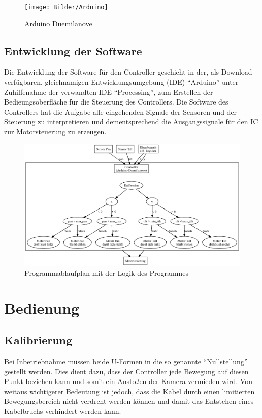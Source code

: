 \documentclass[a4paper, 12pt, bibtotocnumbered, liststotocnumbered]{scrartcl}
\begin{document}
	\begin{figure}[htb]
		\centering
		\texttt{[image: Bilder/Arduino]}
		\caption{Arduino Duemilanove}
	\end{figure}

	\subsection{Entwicklung der Software}
	Die Entwicklung der Software für den Controller geschieht in der, als Download verfügbaren, gleichnamigen Entwicklungsumgebung (IDE) “Arduino” unter Zuhilfenahme der verwandten IDE “Processing”, zum Erstellen der Bedieungsoberfläche für die Steuerung des Controllers.
	Die Software des Controllers hat die Aufgabe alle eingehenden Signale der Sensoren und der Steuerung zu interpretieren und dementsprechend die Ausgangssignale für den IC zur Motorsteuerung zu erzeugen.

	\begin{figure}[htb]
		\centering
		\includegraphics[scale=0.7,angle=90]{Bilder/Programmablaufplan}
		\caption{Programmablaufplan mit der Logik des Programmes}
	\end{figure}

	\section{Bedienung}
	\subsection{Kalibrierung}
	Bei Inbetriebnahme müssen beide U-Formen in die so genannte “Nullstellung” gestellt werden. Dies dient dazu, dass der Controller jede Bewegung auf diesen Punkt beziehen kann und somit ein Anstoßen der Kamera vermieden wird. Von weitaus wichtigerer Bedeutung ist jedoch, dass die Kabel durch einen limitierten Bewegungsbereich nicht verdreht werden können und damit das Entstehen eines Kabelbruchs verhindert werden kann.
\end{document}
